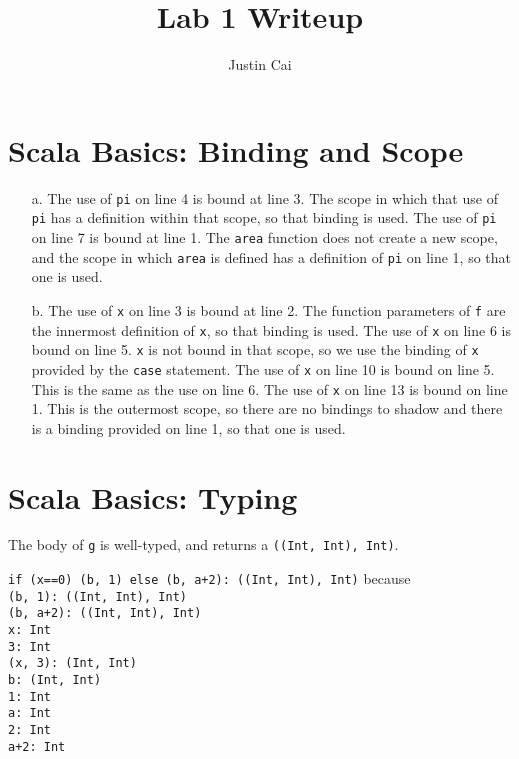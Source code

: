 \documentclass[11pt, letter]{article}
\title{Lab 1 Writeup}
\author{Justin Cai}
\begin{document}
    \maketitle

    \section{Scala Basics: Binding and Scope}
    \begin{itemize}
        \item [a.] The use of \texttt{pi} on line 4 is bound at line 3.
        The scope in which that use of \texttt{pi} has a definition within that scope, so 
        that binding is used. The use of \texttt{pi} on line 7 is bound at line 1. The 
        \texttt{area} function does not create a new scope, and the scope in which \texttt{area}
        is defined has a definition of \texttt{pi} on line 1, so that one is used.
        \item [b.] The use of \texttt{x} on line 3 is bound at line 2. The function parameters of \texttt{f} 
        are the innermost definition of \texttt{x}, so that binding is used.
        The use of \texttt{x} on line 6 is bound on line 5. \texttt{x} is not bound in that scope, so we use
        the binding of \texttt{x} provided by the \texttt{case} statement.
        The use of \texttt{x} on line 10 is bound on line 5. This is the same as the use on line 6.
        The use of \texttt{x} on line 13 is bound on line 1. This is the outermost scope, so there are
        no bindings to shadow and there is a binding provided on line 1, so that one is used.
    \end{itemize}

    \section{Scala Basics: Typing}
    The body of \texttt{g} is well-typed, and returns a \texttt{((Int, Int), Int)}. 
    
    \texttt{if (x==0) (b, 1) else (b, a+2): ((Int, Int), Int)} because\\
    \texttt{(b, 1): ((Int, Int), Int)} \\
    \texttt{(b, a+2): ((Int, Int), Int)} \\
    \texttt{x: Int}\\
    \texttt{3: Int}\\
    \texttt{(x, 3): (Int, Int)} \\
    \texttt{b: (Int, Int)} \\
    \texttt{1: Int} \\
    \texttt{a: Int} \\
    \texttt{2: Int} \\
    \texttt{a+2: Int}
\end{document}
